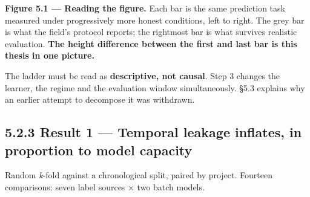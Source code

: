 \textbf{Figure 5.1 --- Reading the figure.} Each bar is the same
prediction task measured under progressively more honest conditions,
left to right. The grey bar is what the field's protocol reports; the
rightmost bar is what survives realistic evaluation. \textbf{The height
difference between the first and last bar is this thesis in one
picture.}

The ladder must be read as \textbf{descriptive, not causal}. Step 3
changes the learner, the regime and the evaluation window
simultaneously. \S{}5.3 explains why an earlier attempt to decompose it was
withdrawn.

\subsection{5.2.3 Result 1 --- Temporal leakage inflates, in proportion
to model
capacity}\label{result-1-temporal-leakage-inflates-in-proportion-to-model-capacity}

Random \emph{k}-fold against a chronological split, paired by project.
Fourteen comparisons: seven label sources \ensuremath{\times} two batch models.

